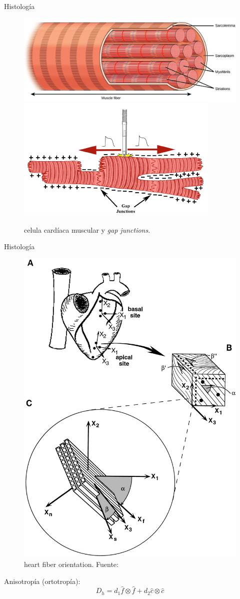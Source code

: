 \documentclass[11pt,spanish]{beamer}
\begin{document}
\begin{frame}{Histología}
\begin{figure}[H]
\centering
\includegraphics[scale=.35]{fig/fundamentals-myocites}
\includegraphics[scale=.6]{fig/fundamentals-gap_junctions} 
\caption{celula cardíaca muscular y \textsl{gap junctions}.} 
\end{figure}
\end{frame}

\begin{frame}{Histología}
\begin{figure}[H]
\centering
\includegraphics[height = 4.5 cm]{fig/fundamentals-direccionmiocitos}
\caption{heart fiber orientation. Fuente: \cite{shearstrain-fiberorientation}} \label{orientacionmiocitos}
\end{figure}
\pause
Anisotropía (ortotropía):
\begin{equation}
D_h = d_1 \hat{f} \otimes \hat{f} + d_2 \hat{c} \otimes \hat{c}
\end{equation}
\end{frame}
\end{document}
